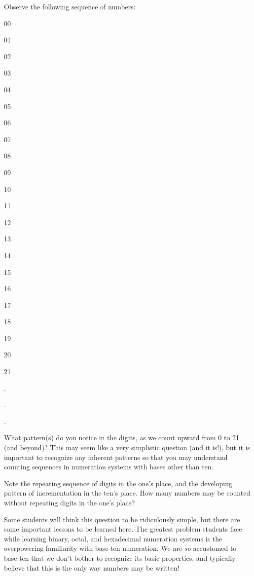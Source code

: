 

Observe the following sequence of numbers:

\vskip 10pt

00

01

02

03

04

05

06

07

08

09

10

11

12

13

14

15

16

17

18

19

20

21

.

.

.

What pattern(s) do you notice in the digits, as we count upward from 0 to 21 (and beyond)?  This may seem like a very simplistic question (and it is!), but it is important to recognize any inherent patterns so that you may understand counting sequences in numeration systems with bases other than ten.







Note the repeating sequence of digits in the one's place, and the developing pattern of incrementation in the ten's place.  How many numbers may be counted without repeating digits in the one's place? 







Some students will think this question to be ridiculously simple, but there are some important lessons to be learned here.  The greatest problem students face while learning binary, octal, and hexadecimal numeration systems is the overpowering familiarity with base-ten numeration.  We are {\it so} accustomed to base-ten that we don't bother to recognize its basic properties, and typically believe that this is the only way numbers may be written!



